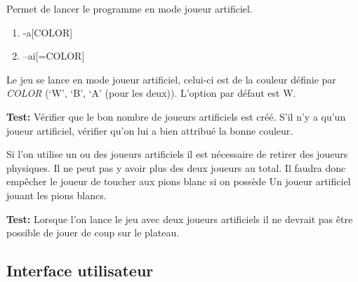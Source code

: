 \documentclass{article}
\begin{document}
\begin{needbox}[F23: Mode IA]
    Permet de lancer le programme en mode joueur artificiel.
    \begin{subneedbox}
        \begin{enumerate}
            \item -a[COLOR]
            \item --ai[=COLOR]
        \end{enumerate}
        Le jeu se lance en mode joueur artificiel, celui-ci est de la couleur
        définie par \textit{COLOR} (`W', `B', `A' (pour les deux)). L'option 
        par défaut est W.

        \textbf{Test:} Vérifier que le bon nombre de joueurs artificiels est créé. 
        S'il n'y a qu'un joueur artificiel, vérifier qu'on lui a bien attribué la bonne
        couleur.
    \end{subneedbox}
    \begin{subneedbox}
        Si l'on utilise un ou des joueurs artificiels il est nécessaire de retirer
        des joueurs physiques. Il ne peut pas y avoir plus des deux joueurs au total.
        Il faudra donc empêcher le joueur de toucher aux pions blanc si on possède Un
        joueur artificiel jouant les pions blancs.

        \textbf{Test:} Lorsque l'on lance le jeu avec deux joueurs artificiels il ne 
        devrait pas être possible de jouer de coup sur le plateau.
    \end{subneedbox}
\end{needbox}

\subsection{Interface utilisateur}
\end{document}
